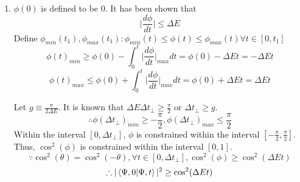 \begin{sol}
\begin{enumerate}[label=\textbf{(\alph*)}]
\item
 $\phi(0)$ is defined to be $0$. It has been shown that 
\begin{equation}
	\bigg|\frac{d\phi}{dt}\bigg|\leq \Delta E
\end{equation}
Define $\phi_{min}(t_1),\phi_{max}(t_1):\phi_{min}(t)\leq\phi(t)\leq\phi_{max}(t)\forall t\in[0,t_1]$  
\begin{equation}
	\phi(t)_{min}\geq\phi(0)-\int_0^t\bigg|\frac{d\phi}{dt}\bigg|_{max}dt=\phi(0)-\Delta Et=-\Delta Et
\end{equation}
\begin{equation}
	\phi(t)_{max}\leq\phi(0)+\int_0^t\bigg|\frac{d\phi}{dt}\bigg|_{max}dt=\phi(0)+\Delta Et=\Delta Et
\end{equation}

Let $\displaystyle{g\equiv\frac{\pi}{2\Delta E}}$. It is known that $\displaystyle{\Delta E\Delta t_\perp\geq\frac{\pi}{2}}$ or $\Delta t_\perp\geq g$.
\begin{equation}
	\therefore \phi(\Delta t_\perp)_{min}\geq-\frac{\pi}{2},\phi(\Delta t_\perp)_{max}\leq\frac{\pi}{2}
\end{equation}
Within the interval $[0,\Delta t_\perp]$, $\phi$ is constrained within the interval $\left[-\frac{\pi}{2},\frac{\pi}{2}\right]$. Thus, $\cos^2(\phi)$ is constrained within the interval $[0,1]$. 
\begin{equation}
	\because\cos^2(\theta)=\cos^2(-\theta), \forall t\in[0,\Delta t_\perp], \cos^2(\phi)\geq\cos^2(\Delta Et)
\end{equation} \begin{equation}
	\therefore|\braket{\Psi,0}{\Psi,t}|^2\geq\cos^2(\Delta Et)
\end{equation} 


\end{enumerate}
\end{sol}